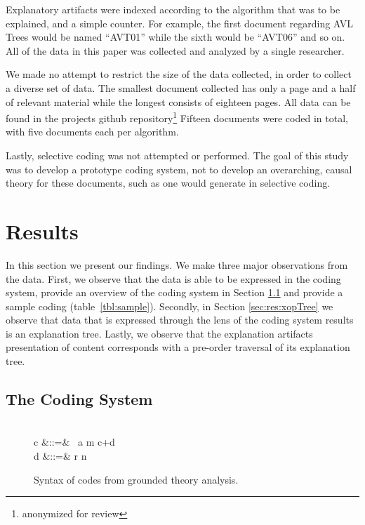 \documentclass[sigconf]{acmart}
\begin{document}
Explanatory artifacts were indexed according to the algorithm that was to be
explained, and a simple counter. For example, the first document regarding AVL
Trees would be named ``AVT01'' while the sixth would be ``AVT06'' and so on.
All of the data in this paper was collected and analyzed by a single researcher.

We made no attempt to restrict the size of the data collected, in order to
collect a diverse set of data. The smallest document collected has only a page
and a half of relevant material while the longest consists of eighteen pages.
All data can be found in the projects github repository\footnote[1]{anonymized
  for review}  Fifteen
documents were coded in total, with five documents each per algorithm.

Lastly, selective coding was not attempted or performed. The goal of this study
was to develop a prototype coding system, not to develop an overarching, causal
theory for these documents, such as one would generate in selective coding.


\section{Results}

In this section we present our findings. We make three major observations from
the data. First, we observe that the data is able to be expressed in the coding
system, provide an overview of the coding system in Section \ref{sec:res:sys}
and provide a sample coding (table~\ref{tbl:sample}). Secondly, in Section
\ref{sec:res:xopTree} we observe that data that is expressed through the lens of
the coding system results is an explanation tree. Lastly, we observe that the
explanation artifacts presentation of content corresponds with a pre-order
traversal of its explanation tree.

\subsection{The Coding System}
\label{sec:res:sys}

\newcommand{\OR}{\OB{\hspace{1.5ex}|\hspace{1.5ex}}}

\newcommand{\Push}{\OB{\Rightarrow}}
\newcommand{\Pop}{\OB{\Leftarrow}}
\newcommand{\PopPush}{\OB{\Leftrightarrow}}

\begin{figure}
\begin{syntax}
 \\
c\in{}
 &::=& \Push~a
 \OR \!\Pop\!
 \OR m
 \OR c+d \\
d\in{}
 &::=& r \OR n
\end{syntax}

\vspace{-1.5ex}
\caption{Syntax of codes from grounded theory analysis.}
\label{tbl:codes:syntax}
\end{figure}
\end{document}

